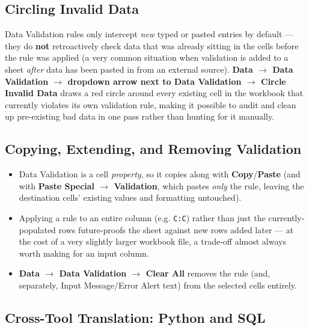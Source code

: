 \documentclass[11pt,a4paper]{article}
\begin{document}
\subsection{Circling Invalid Data}

\begin{protip}
Data Validation rules only intercept \emph{new} typed or pasted entries by default --- they do \textbf{not} retroactively check data that was already sitting in the cells before the rule was applied (a very common situation when validation is added to a sheet \emph{after} data has been pasted in from an external source). \textbf{Data $\rightarrow$ Data Validation $\rightarrow$ dropdown arrow next to Data Validation $\rightarrow$ Circle Invalid Data} draws a red circle around every existing cell in the workbook that currently violates its own validation rule, making it possible to audit and clean up pre-existing bad data in one pass rather than hunting for it manually.
\end{protip}

\subsection{Copying, Extending, and Removing Validation}

\begin{itemize}
  \item Data Validation is a cell \emph{property}, so it copies along with \textbf{Copy}/\textbf{Paste} (and with \textbf{Paste Special $\rightarrow$ Validation}, which pastes \emph{only} the rule, leaving the destination cells' existing values and formatting untouched).
  \item Applying a rule to an entire column (e.g. \texttt{C:C}) rather than just the currently-populated rows future-proofs the sheet against new rows added later --- at the cost of a very slightly larger workbook file, a trade-off almost always worth making for an input column.
  \item \textbf{Data $\rightarrow$ Data Validation $\rightarrow$ Clear All} removes the rule (and, separately, Input Message/Error Alert text) from the selected cells entirely.
\end{itemize}

\subsection{Cross-Tool Translation: Python and SQL}
\end{document}
